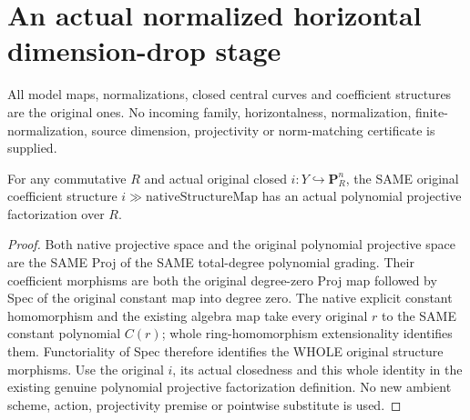 \section{An actual normalized horizontal dimension-drop stage}
All model maps, normalizations, closed central curves and coefficient
structures are the original ones. No incoming family, horizontalness,
normalization, finite-normalization, source dimension, projectivity or
norm-matching certificate is supplied.

\begin{lemma}
\label{lem:pl-gauss-original-native-structure-projective-factorization}
\leanok
For any commutative $R$ and actual original closed
$i:Y\hookrightarrow\mathbf P^n_R$, the SAME original coefficient
structure $i\gg\mathrm{nativeStructureMap}$ has an actual polynomial
projective factorization over $R$.
\end{lemma}
\begin{proof}
Both native projective space and the original polynomial projective
space are the SAME Proj of the SAME total-degree polynomial grading.
Their coefficient morphisms are both the original degree-zero Proj
map followed by Spec of the original constant map into degree zero.
The native explicit constant homomorphism and the existing algebra
map take every original $r$ to the SAME constant polynomial $C(r)$;
whole ring-homomorphism extensionality identifies them. Functoriality
of Spec therefore identifies the WHOLE original structure morphisms.
Use the original $i$, its actual closedness and this whole identity
in the existing genuine polynomial projective factorization definition.
No new ambient scheme, action, projectivity premise or pointwise
substitute is used.
\end{proof}

